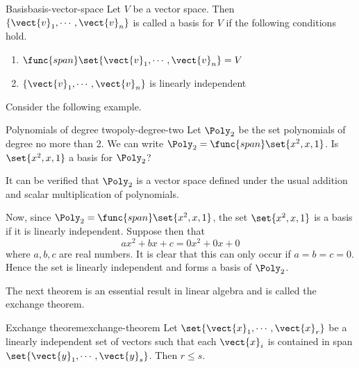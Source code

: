 \begin{definition}{Basis}{basis-vector-space}
Let $V$ be a vector space. Then $\{\vect{v}_{1},\cdots ,\vect{v}_{n}\}$ is called a basis for $V$ if the following conditions hold.
\begin{enumerate}
\item
$\func{span}\set{\vect{v}_{1},\cdots ,\vect{v}_{n}} = V$
\item
$\{\vect{v}_{1},\cdots ,\vect{v}_{n}\}$ is linearly independent
\end{enumerate}
\end{definition}

Consider the following example.

\begin{example}{Polynomials of degree two}{poly-degree-two}
Let $\Poly_2$ be the set polynomials of degree no more than 2. We can write
$\Poly_2=\func{span}\set{x^{2}, x, 1}$. Is $\set{x^{2}, x, 1} $ a
basis for $\Poly_2$?
\end{example}

\begin{solution}
It can be verified that $\Poly_2$ is a vector space defined under the usual addition and scalar multiplication of polynomials. 

Now, since $\Poly_2=\func{span}\set{x^{2},x, 1}$, the set  $\set{x^{2}, x, 1} $ is a basis if it is linearly independent. Suppose then that 
\begin{equation*}
ax^{2}+bx+c=0x^2 + 0x + 0 
\end{equation*}
where $a,b,c$ are real numbers. It is clear that this can only occur if $a=b=c=0$. Hence the set is linearly independent and forms a basis of $\Poly_2$.
\end{solution}

The next theorem is an essential result in linear algebra and is called the exchange theorem.

\begin{theorem}{Exchange theorem}{exchange-theorem}
Let $\set{\vect{x}_{1},\cdots ,\vect{x}_{r}} $
be a linearly independent set of vectors such that each $\vect{x}_{i}$ is
contained in span$\set{\vect{y}_{1},\cdots ,\vect{y}_{s}}$. Then $
r\leq s$.
\end{theorem}

